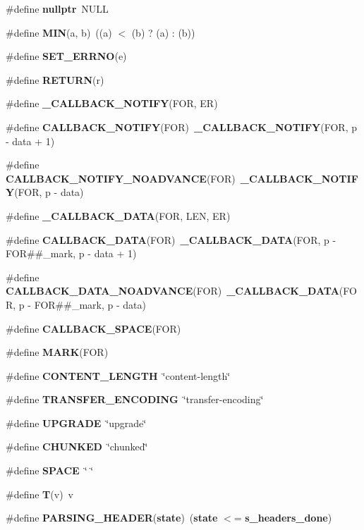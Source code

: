 \begin{DoxyCompactItemize}
\item 
\#define {\bf nullptr}~N\+U\+LL
\item 
\#define {\bf M\+IN}(a,  b)~((a) $<$ (b) ? (a) \+: (b))
\item 
\#define {\bf S\+E\+T\+\_\+\+E\+R\+R\+NO}(e)
\item 
\#define {\bf R\+E\+T\+U\+RN}(r)
\item 
\#define {\bf \+\_\+\+C\+A\+L\+L\+B\+A\+C\+K\+\_\+\+N\+O\+T\+I\+FY}(F\+OR,  ER)
\item 
\#define {\bf C\+A\+L\+L\+B\+A\+C\+K\+\_\+\+N\+O\+T\+I\+FY}(F\+OR)~{\bf \+\_\+\+C\+A\+L\+L\+B\+A\+C\+K\+\_\+\+N\+O\+T\+I\+FY}(F\+OR, p -\/ data + 1)
\item 
\#define {\bf C\+A\+L\+L\+B\+A\+C\+K\+\_\+\+N\+O\+T\+I\+F\+Y\+\_\+\+N\+O\+A\+D\+V\+A\+N\+CE}(F\+OR)~{\bf \+\_\+\+C\+A\+L\+L\+B\+A\+C\+K\+\_\+\+N\+O\+T\+I\+FY}(F\+OR, p -\/ data)
\item 
\#define {\bf \+\_\+\+C\+A\+L\+L\+B\+A\+C\+K\+\_\+\+D\+A\+TA}(F\+OR,  L\+EN,  ER)
\item 
\#define {\bf C\+A\+L\+L\+B\+A\+C\+K\+\_\+\+D\+A\+TA}(F\+OR)~{\bf \+\_\+\+C\+A\+L\+L\+B\+A\+C\+K\+\_\+\+D\+A\+TA}(F\+OR, p -\/ F\+OR\#\#\+\_\+mark, p -\/ data + 1)
\item 
\#define {\bf C\+A\+L\+L\+B\+A\+C\+K\+\_\+\+D\+A\+T\+A\+\_\+\+N\+O\+A\+D\+V\+A\+N\+CE}(F\+OR)~{\bf \+\_\+\+C\+A\+L\+L\+B\+A\+C\+K\+\_\+\+D\+A\+TA}(F\+OR, p -\/ F\+OR\#\#\+\_\+mark, p -\/ data)
\item 
\#define {\bf C\+A\+L\+L\+B\+A\+C\+K\+\_\+\+S\+P\+A\+CE}(F\+OR)
\item 
\#define {\bf M\+A\+RK}(F\+OR)
\item 
\#define {\bf C\+O\+N\+T\+E\+N\+T\+\_\+\+L\+E\+N\+G\+TH}~\char`\"{}content-\/length\char`\"{}
\item 
\#define {\bf T\+R\+A\+N\+S\+F\+E\+R\+\_\+\+E\+N\+C\+O\+D\+I\+NG}~\char`\"{}transfer-\/encoding\char`\"{}
\item 
\#define {\bf U\+P\+G\+R\+A\+DE}~\char`\"{}upgrade\char`\"{}
\item 
\#define {\bf C\+H\+U\+N\+K\+ED}~\char`\"{}chunked\char`\"{}
\item 
\#define {\bf S\+P\+A\+CE}~\char`\"{} \char`\"{}
\item 
\#define {\bf T}(v)~v
\item 
\#define {\bf P\+A\+R\+S\+I\+N\+G\+\_\+\+H\+E\+A\+D\+ER}({\bf state})~({\bf state} $<$= {\bf s\+\_\+headers\+\_\+done})
\item 

\end{DoxyCompactItemize}
